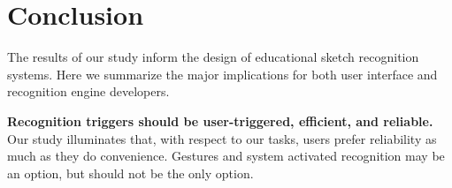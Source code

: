 \documentclass{egpubl}
\begin{document}




 
\section{Conclusion}
The results of our study inform the design of educational sketch
recognition systems.  Here we summarize the major implications for
both user interface and recognition engine developers.

\textbf{Recognition triggers should be user-triggered, efficient, and
reliable.} Our study illuminates that, with respect to our tasks, users
prefer reliability as much as they do convenience.  Gestures and
system activated recognition may be an option, but should not be the
only option.  
\end{document}
